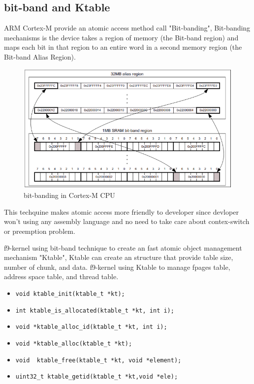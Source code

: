\documentclass[10pt,preprint,nocopyrightspace]{sigplanconf}
\begin{document}
\subsection{bit-band and Ktable}
ARM Cortex-M provide an atomic access method call "Bit-banding", Bit-banding mechanisms is the device takes a region of memory (the Bit-band region) and maps each bit in that region to an entire word in a second memory region (the Bit-band Alias Region).\cite{schaenzle2013}

\begin{figure}[H]
\begin{center}
	\includegraphics[width=\linewidth]{picture/bit-banding.png}
\end{center}
\caption{bit-banding in Cortex-M CPU\cite{st2016manual}}
\end{figure}

This techquine makes atomic access more friendly to developer since devloper won't using any assembly language and no need to take care about contex-switch or preemption problem.

f9-kernel using bit-band technique to create an fast atomic object management mechanism "Ktable", Ktable can create an structure that provide table size, number of chunk, and data. f9-kernel using Ktable to manage fpages table, address space table, and thread table.

\begin{itemize}
\footnotesize
\item \verb|void ktable_init(ktable_t *kt);|
\item \verb|int ktable_is_allocated(ktable_t *kt, int i);|
\item \verb|void *ktable_alloc_id(ktable_t *kt, int i);|
\item \verb|void *ktable_alloc(ktable_t *kt);|
\item \verb|void  ktable_free(ktable_t *kt, void *element);|
\item \verb|uint32_t ktable_getid(ktable_t *kt,void *ele);|
\end{itemize}
\end{document}
